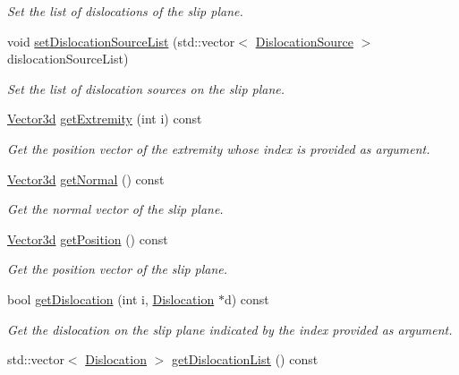\begin{DoxyCompactItemize}
\begin{DoxyCompactList}\small\item\em \-Set the list of dislocations of the slip plane. \end{DoxyCompactList}\item 
void \hyperlink{classSlipPlane_a6f520005b3c7e8c93df0b893201cea29}{set\-Dislocation\-Source\-List} (std\-::vector$<$ \hyperlink{classDislocationSource}{\-Dislocation\-Source} $>$ dislocation\-Source\-List)
\begin{DoxyCompactList}\small\item\em \-Set the list of dislocation sources on the slip plane. \end{DoxyCompactList}\item 
\hyperlink{classVector3d}{\-Vector3d} \hyperlink{classSlipPlane_a1df9437ef558f9dc7ec9fba62371e5e4}{get\-Extremity} (int i) const 
\begin{DoxyCompactList}\small\item\em \-Get the position vector of the extremity whose index is provided as argument. \end{DoxyCompactList}\item 
\hyperlink{classVector3d}{\-Vector3d} \hyperlink{classSlipPlane_a2b8043348d0b48318c0f3b6b9a43b5bc}{get\-Normal} () const 
\begin{DoxyCompactList}\small\item\em \-Get the normal vector of the slip plane. \end{DoxyCompactList}\item 
\hyperlink{classVector3d}{\-Vector3d} \hyperlink{classSlipPlane_a7ff7aec8b12e5711b3e01448a558200c}{get\-Position} () const 
\begin{DoxyCompactList}\small\item\em \-Get the position vector of the slip plane. \end{DoxyCompactList}\item 
bool \hyperlink{classSlipPlane_ae1c9a31425cacb758a10353d7b3cbc35}{get\-Dislocation} (int i, \hyperlink{classDislocation}{\-Dislocation} $\ast$d) const 
\begin{DoxyCompactList}\small\item\em \-Get the dislocation on the slip plane indicated by the index provided as argument. \end{DoxyCompactList}\item 
std\-::vector$<$ \hyperlink{classDislocation}{\-Dislocation} $>$ \hyperlink{classSlipPlane_a16b894e5cecbd0e11f050c287de22b8d}{get\-Dislocation\-List} () const 

\end{DoxyCompactItemize}
